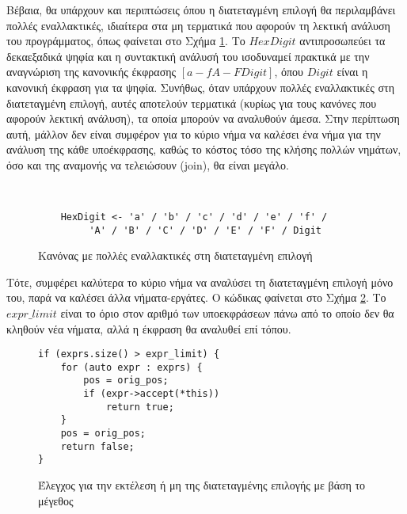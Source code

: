 
Βέβαια, θα υπάρχουν και περιπτώσεις όπου η διατεταγμένη επιλογή θα περιλαμβάνει πολλές εναλλακτικές, ιδιαίτερα στα μη τερματικά που αφορούν τη λεκτική ανάλυση του προγράμματος, όπως φαίνεται στο Σχήμα \ref{fig:top_down_4}.
  Το $HexDigit$ αντιπροσωπεύει τα δεκαεξαδικά ψηφία και η συντακτική ανάλυσή του ισοδυναμεί πρακτικά με την αναγνώριση της κανονικής έκφρασης $[a-fA-FDigit]$, όπου $Digit$ είναι η κανονική έκφραση για τα ψηφία.
Συνήθως, όταν υπάρχουν πολλές εναλλακτικές στη διατεταγμένη επιλογή, αυτές αποτελούν τερματικά (κυρίως για τους κανόνες που αφορούν λεκτική ανάλυση), τα οποία μπορούν να αναλυθούν άμεσα. 
Στην περίπτωση αυτή, μάλλον δεν είναι συμφέρον για το κύριο νήμα να καλέσει ένα νήμα για την ανάλυση της κάθε υποέκφρασης, καθώς το κόστος τόσο της κλήσης πολλών νημάτων, όσο και της αναμονής να τελειώσουν (join), θα είναι μεγάλο.

\begin{figure}[h]
\begin{Verbatim}


	HexDigit <- 'a' / 'b' / 'c' / 'd' / 'e' / 'f' / 
   		 'A' / 'B' / 'C' / 'D' / 'E' / 'F' / Digit
\end{Verbatim}
\caption{Κανόνας με πολλές εναλλακτικές στη διατεταγμένη επιλογή}
\label{fig:top_down_4}
\end{figure}

Τότε, συμφέρει καλύτερα το κύριο νήμα να αναλύσει τη διατεταγμένη επιλογή μόνο του, παρά να καλέσει άλλα νήματα-εργάτες. 
Ο κώδικας φαίνεται στο Σχήμα \ref{fig:expr_size}.
Το $expr\_limit$ είναι το όριο στον αριθμό των υποεκφράσεων πάνω από το οποίο δεν θα κληθούν νέα νήματα, αλλά η έκφραση θα αναλυθεί επί τόπου.


\begin{figure}[h]
\setlength\partopsep{-\topsep}%
\begin{verbatim}
if (exprs.size() > expr_limit) {    
    for (auto expr : exprs) {
        pos = orig_pos;
        if (expr->accept(*this))
            return true;
    }
    pos = orig_pos;
    return false;
}
\end{verbatim}
\caption{Έλεγχος για την εκτέλεση ή μη της διατεταγμένης επιλογής με βάση το μέγεθος}
\label{fig:expr_size}
\end{figure}

